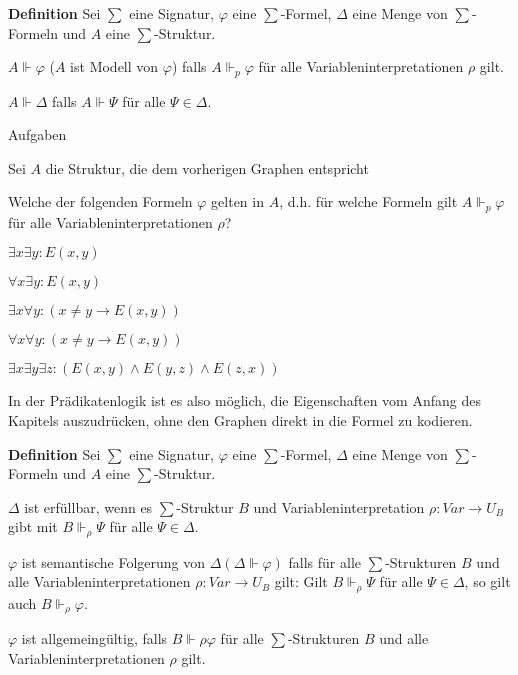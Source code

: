 \documentclass[a4paper]{article}
\renewcommand{\note}[2]{\begin{noteBox} \textbf{#1} #2 \end{noteBox}}
\begin{document}
\begin{multicols}{3}
  \note{Definition}{Sei $\sum$ eine Signatur, $\varphi$ eine $\sum$-Formel, $\Delta$ eine Menge von $\sum$-Formeln und $A$ eine $\sum$-Struktur.
    \begin{itemize*}
      \item $A\Vdash\varphi$ ($A$ ist Modell von $\varphi$) falls $A\Vdash_p\varphi$ für alle Variableninterpretationen $\rho$ gilt.
      \item $A\Vdash\Delta$ falls $A\Vdash\Psi$ für alle $\Psi\in\Delta$.
    \end{itemize*}
  }

  Aufgaben
  \begin{itemize*}
    \item Sei $A$ die Struktur, die dem vorherigen Graphen entspricht
    \item Welche der folgenden Formeln $\varphi$ gelten in $A$, d.h. für welche Formeln gilt $A\Vdash_p\varphi$ für alle Variableninterpretationen $\rho$?
    \begin{enumerate*}
      \item $\exists x\exists y:E(x,y)$
      \item $\forall x\exists y:E(x,y)$
      \item $\exists x\forall y:(x\not=y\rightarrow E(x,y))$
      \item $\forall x\forall y:(x\not=y\rightarrow E(x,y))$
      \item $\exists x\exists y\exists z:(E(x,y)\wedge E(y,z)\wedge E(z,x))$
    \end{enumerate*}
    \item In der Prädikatenlogik ist es also möglich, die Eigenschaften vom Anfang des Kapitels auszudrücken, ohne den Graphen direkt in die Formel zu kodieren.
  \end{itemize*}

  \note{Definition}{Sei $\sum$ eine Signatur, $\varphi$ eine $\sum$-Formel, $\Delta$ eine Menge von $\sum$-Formeln und $A$ eine $\sum$-Struktur.
    \begin{itemize*}
      \item $\Delta$ ist erfüllbar, wenn es $\sum$-Struktur $B$ und Variableninterpretation $\rho:Var\rightarrow U_B$ gibt mit $B\Vdash_\rho\Psi$ für alle $\Psi\in\Delta$.
      \item $\varphi$ ist semantische Folgerung von $\Delta(\Delta\Vdash\varphi)$ falls für alle $\sum$-Strukturen $B$ und alle Variableninterpretationen $\rho:Var\rightarrow U_B$ gilt: Gilt $B\Vdash_\rho\Psi$ für alle $\Psi\in\Delta$, so gilt auch $B\Vdash_\rho \varphi$.
      \item $\varphi$ ist allgemeingültig, falls $B\Vdash \rho\varphi$ für alle $\sum$-Strukturen $B$ und alle Variableninterpretationen $\rho$ gilt.
    \end{itemize*}
  }


\end{multicols}
\end{document}

